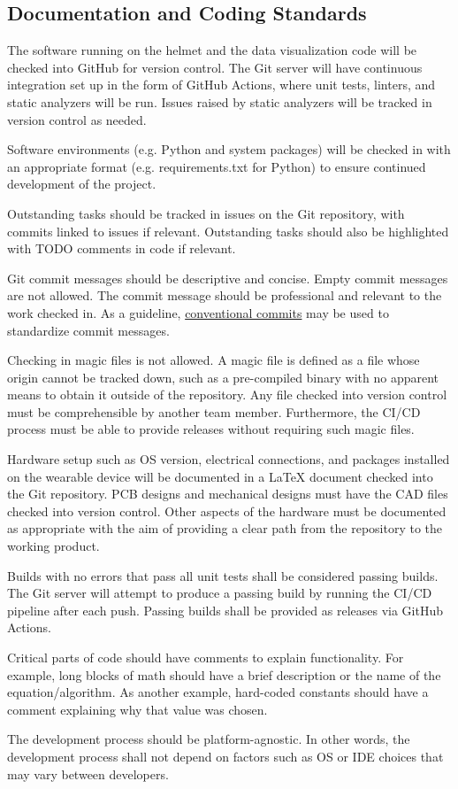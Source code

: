 \documentclass[11pt]{article}
\begin{document}
		
		\pagebreak
		\subsection{Documentation and Coding Standards} %
			The software running on the helmet and the data visualization code will be checked into GitHub for version control. The Git server will have continuous integration set up in the form of GitHub Actions, where unit tests, linters, and static analyzers will be run. Issues raised by static analyzers will be tracked in version control as needed.
			
			Software environments (e.g. Python and system packages) will be checked in with an appropriate format (e.g. requirements.txt for Python) to ensure continued development of the project.
			
			Outstanding tasks should be tracked in issues on the Git repository, with commits linked to issues if relevant. Outstanding tasks should also be highlighted with TODO comments in code if relevant.
			
			Git commit messages should be descriptive and concise. Empty commit messages are not allowed. The commit message should be professional and relevant to the work checked in. As a guideline, \href{https://www.conventionalcommits.org/en/v1.0.0/#summary}{conventional commits} may be used to standardize commit messages.
			
			Checking in magic files is not allowed. A magic file is defined as a file whose origin cannot be tracked down, such as a pre-compiled binary with no apparent means to obtain it outside of the repository. Any file checked into version control must be comprehensible by another team member. Furthermore, the CI/CD process must be able to provide releases without requiring such magic files.
			
			Hardware setup such as OS version, electrical connections, and packages installed on the wearable device will be documented in a LaTeX document checked into the Git repository. PCB designs and mechanical designs must have the CAD files checked into version control. Other aspects of the hardware must be documented as appropriate with the aim of providing a clear path from the repository to the working product.
			
			Builds with no errors that pass all unit tests shall be considered passing builds. The Git server will attempt to produce a passing build by running the CI/CD pipeline after each push. Passing builds shall be provided as releases via GitHub Actions.
			
			Critical parts of code should have comments to explain functionality. For example, long blocks of math should have a brief description or the name of the equation/algorithm. As another example, hard-coded constants should have a comment explaining why that value was chosen.
			
			The development process should be platform-agnostic. In other words, the development process shall not depend on factors such as OS or IDE choices that may vary between developers.
			
\end{document}

